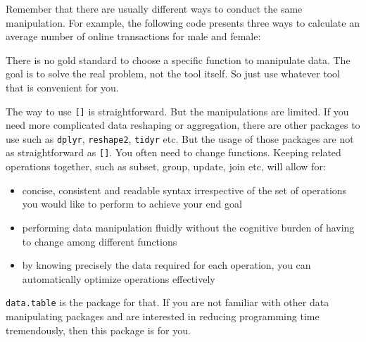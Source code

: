 \documentclass[
  12pt,
]{krantz}
\makeatletter
\newenvironment{Shaded}{\begin{snugshade}}{\end{snugshade}}
\newcommand{\AttributeTok}[1]{\textcolor[rgb]{0.61,0.61,0.61}{#1}}
\newcommand{\FunctionTok}[1]{\textcolor[rgb]{0,0,0}{#1}}
\newcommand{\NormalTok}[1]{#1}
\newcommand{\SpecialCharTok}[1]{\textcolor[rgb]{0,0,0}{#1}}
\providecommand{\tightlist}{%
  \setlength{\itemsep}{0pt}\setlength{\parskip}{0pt}}
\newenvironment{kframe}{%
\medskip{}
\setlength{\fboxsep}{.8em}
 \def\at@end@of@kframe{}%
 \ifinner\ifhmode%
  \def\at@end@of@kframe{\end{minipage}}%
  \begin{minipage}{\columnwidth}%
 \fi\fi%
 \def\FrameCommand##1{\hskip\@totalleftmargin \hskip-\fboxsep
 \colorbox{shadecolor}{##1}\hskip-\fboxsep
     \hskip-\linewidth \hskip-\@totalleftmargin \hskip\columnwidth}%
 \MakeFramed {\advance\hsize-\width
   \@totalleftmargin\z@ \linewidth\hsize
   \@setminipage}}%
 {\par\unskip\endMakeFramed%
 \at@end@of@kframe}
\renewenvironment{Shaded}{\begin{kframe}}{\end{kframe}}
\makeatother
\begin{document}
Remember that there are usually different ways to conduct the same manipulation. For example, the following code presents three ways to calculate an average number of online transactions for male and female:

\begin{Shaded}
\end{Shaded}

There is no gold standard to choose a specific function to manipulate data. The goal is to solve the real problem, not the tool itself. So just use whatever tool that is convenient for you.

The way to use \texttt{{[}{]}} is straightforward. But the manipulations are limited. If you need more complicated data reshaping or aggregation, there are other packages to use such as \texttt{dplyr}, \texttt{reshape2}, \texttt{tidyr} etc. But the usage of those packages are not as straightforward as \texttt{{[}{]}}. You often need to change functions. Keeping related operations together, such as subset, group, update, join etc, will allow for:

\begin{itemize}
\tightlist
\item
  concise, consistent and readable syntax irrespective of the set of operations you would like to perform to achieve your end goal
\item
  performing data manipulation fluidly without the cognitive burden of having to change among different functions
\item
  by knowing precisely the data required for each operation, you can automatically optimize operations effectively
\end{itemize}

\texttt{data.table} is the package for that. If you are not familiar with other data manipulating packages and are interested in reducing programming time tremendously, then this package is for you.
\end{document}

